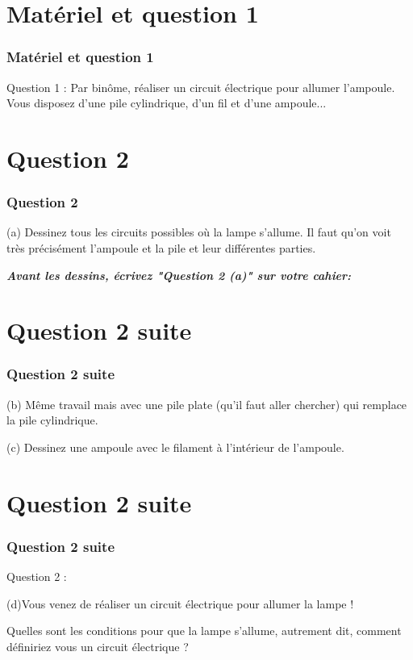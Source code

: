 \documentclass{beamer}
\begin{document}
\section{Matériel et question 1}
\begin{frame}
\frametitle{Matériel et question 1}
Question 1 : Par binôme, réaliser un circuit électrique pour allumer l’ampoule. Vous disposez d’une
pile cylindrique, d’un fil et d’une ampoule...
\end{frame}


\section{Question 2}
\begin{frame}
\frametitle{Question 2}

(a) Dessinez tous les circuits possibles où la lampe s’allume.
Il faut qu'on voit très précisément l'ampoule et la pile et leur différentes parties.

\vspace{10pt}
\textbf{\textit{Avant les dessins, écrivez "Question 2 (a)" sur votre cahier:}}

\end{frame}



\section{Question 2 suite}
\begin{frame}
\frametitle{Question 2 suite}
(b) Même travail mais avec une pile plate (qu’il faut aller chercher) qui remplace la pile cylindrique.

\vspace{5pt}
(c) Dessinez  une ampoule avec le filament à l’intérieur de l’ampoule.
\end{frame}



\section{Question 2 suite}
\begin{frame}
\frametitle{Question 2 suite}
Question 2 :

(d)Vous venez de réaliser un circuit électrique pour allumer la lampe ! 

Quelles sont les conditions pour que la lampe s’allume, autrement dit, comment définiriez vous un circuit électrique ?
\end{frame}
\end{document}
